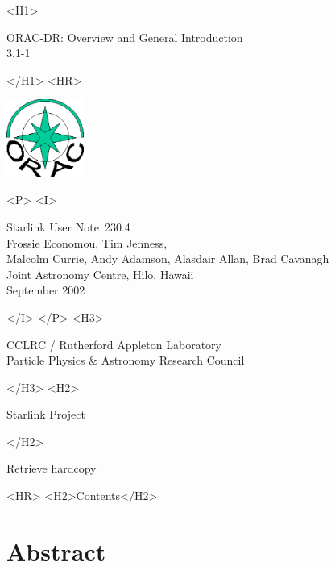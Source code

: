 \documentclass[twoside,11pt]{article}
\newcommand{\stardoccategory}  {Starlink User Note}
\newcommand{\stardocsource}    {sun\stardocnumber}
\newcommand{\stardocnumber}    {230.4}
\newcommand{\stardocauthors}   {Frossie Economou, Tim Jenness,\\ 
Malcolm Currie, Andy Adamson, Alasdair Allan, Brad Cavanagh\\
Joint Astronomy Centre, Hilo, Hawaii}
\newcommand{\stardocdate}      {September 2002}
\newcommand{\stardoctitle}     {ORAC-DR: Overview and General Introduction}
\newcommand{\stardocversion}   {3.1-1}
\newcommand{\stardocmanual}    {}
\newcommand{\htmladdnormallink}[2]{#1}
\newcommand{\htmladdimg}[1]{}
\newcommand{\htmlref}[2]{#1}
\newcommand{\htmladdtonavigation}[1]{}
\newcommand{\xlabel}[1]{}
\renewcommand{\_}{\texttt{\symbol{95}}}
\begin{document}
\begin{htmlonly}
   \xlabel{}
   \begin{rawhtml} <H1> \end{rawhtml}
      \stardoctitle\\
      \stardocversion\\
      \stardocmanual
   \begin{rawhtml} </H1> <HR> \end{rawhtml}

\includegraphics[width=1.0in]{sun230_logo.eps}

   \begin{rawhtml} <P> <I> \end{rawhtml}
   \stardoccategory\ \stardocnumber \\
   \stardocauthors \\
   \stardocdate
   \begin{rawhtml} </I> </P> <H3> \end{rawhtml}
      \htmladdnormallink{CCLRC / Rutherford Appleton Laboratory}
                        {http://www.cclrc.ac.uk} \\
      \htmladdnormallink{Particle Physics \& Astronomy Research Council}
                        {http://www.pparc.ac.uk} \\
   \begin{rawhtml} </H3> <H2> \end{rawhtml}
      \htmladdnormallink{Starlink Project}{http://www.starlink.rl.ac.uk/}
   \begin{rawhtml} </H2> \end{rawhtml}
   \htmladdnormallink{\htmladdimg{source.gif} Retrieve hardcopy}
      {http://www.starlink.rl.ac.uk/cgi-bin/hcserver?\stardocsource}\\

  \label{stardoccontents}
  \begin{rawhtml} 
    <HR>
    <H2>Contents</H2>
  \end{rawhtml}
  \htmladdtonavigation{\htmlref{\htmladdimg{contents_motif.gif}}
        {stardoccontents}}

  \section{\xlabel{abstract}Abstract}
\end{htmlonly}
\end{document}
